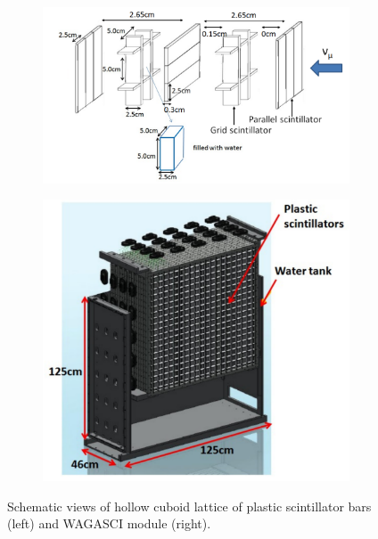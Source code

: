 \begin{figure}[tbhp]
  \begin{center}
   \begin{subfigure}{0.48\textwidth}
     \includegraphics[width=\linewidth]{fig/3d_grid_structure.pdf}
    \end{subfigure}
  \begin{subfigure}{0.48\textwidth}
      \includegraphics[width=\linewidth]{fig/wagasci_mod.pdf}
    \end{subfigure}    
    \end{center}
  \caption{Schematic views of hollow cuboid lattice of plastic scintillator bars (left) and WAGASCI module (right).}
\label{fig:3dgrid_wagascimod}
\end{figure}


